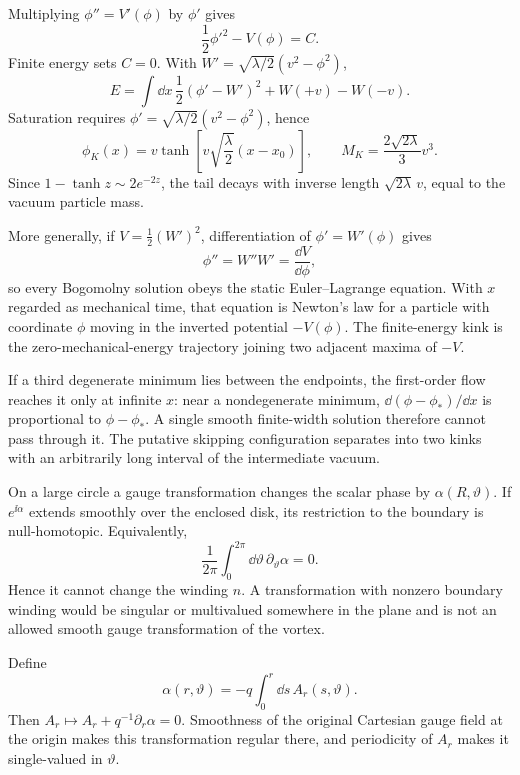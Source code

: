 \begin{enumerate}
  Multiplying \(\phi''=V'(\phi)\) by \(\phi'\) gives
  \[
    \frac12\phi'^2-V(\phi)=C.
  \]
  Finite energy sets \(C=0\).  With
  \(W'=\sqrt{\lambda/2}(v^2-\phi^2)\),
  \[
    E=\int \dd x\,\frac12(\phi'-W')^2+W(+v)-W(-v).
  \]
  Saturation requires
  \(\phi'=\sqrt{\lambda/2}(v^2-\phi^2)\), hence
  \[
    \boxed{\phi_K(x)=v\tanh\!\left[
      v\sqrt{\frac{\lambda}{2}}(x-x_0)\right]},
    \qquad
    \boxed{M_K=\frac{2\sqrt{2\lambda}}{3}v^3}.
  \]
  Since \(1-\tanh z\sim2e^{-2z}\), the tail decays with inverse length
  \(\sqrt{2\lambda}\,v\), equal to the vacuum particle mass.

  More generally, if \(V=\frac12(W')^2\), differentiation of
  \(\phi'=W'(\phi)\) gives
  \[
    \phi''=W''W'=\frac{\dd V}{\dd\phi},
  \]
  so every Bogomolny solution obeys the static Euler--Lagrange equation.
  With \(x\) regarded as mechanical time, that equation is Newton's law
  for a particle with coordinate \(\phi\) moving in the inverted potential
  \(-V(\phi)\).  The finite-energy kink is the zero-mechanical-energy
  trajectory joining two adjacent maxima of \(-V\).

  If a third degenerate minimum lies between the endpoints, the first-order
  flow reaches it only at infinite \(x\): near a nondegenerate minimum,
  \(\dd(\phi-\phi_*)/\dd x\) is proportional to \(\phi-\phi_*\).  A single smooth
  finite-width solution therefore cannot pass through it.  The putative
  skipping configuration separates into two kinks with an arbitrarily long
  interval of the intermediate vacuum.

  On a large circle a gauge transformation changes the scalar phase by
  \(\alpha(R,\vartheta)\).  If \(e^{\ii\alpha}\) extends smoothly over the
  enclosed disk, its restriction to the boundary is null-homotopic.
  Equivalently,
  \[
    \frac{1}{2\pi}\int_0^{2\pi}
      \dd\vartheta\,\partial_\vartheta\alpha=0.
  \]
  Hence it cannot change the winding \(n\).  A transformation with nonzero
  boundary winding would be singular or multivalued somewhere in the
  plane and is not an allowed smooth gauge transformation of the vortex.

  Define
  \[
    \alpha(r,\vartheta)
      =-q\int_0^r \dd s\,A_r(s,\vartheta).
  \]
  Then \(A_r\mapsto A_r+q^{-1}\partial_r\alpha=0\).  Smoothness of the
  original Cartesian gauge field at the origin makes this transformation
  regular there, and periodicity of \(A_r\) makes it single-valued in
  \(\vartheta\).


\end{enumerate}
